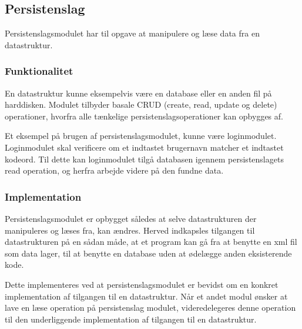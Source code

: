 \subsection{Persistenslag}
\label{sub:persistenslag}

Persistenslagsmodulet har til opgave at manipulere og læse data fra en datastruktur. 

\subsubsection{Funktionalitet}
\label{ssub:persistenslag_funktionalitet}

En datastruktur kunne eksempelvis være en database eller en anden fil på harddisken. Modulet tilbyder basale CRUD (create, read, update og delete) operationer, hvorfra alle tænkelige persistenslagsoperationer kan opbygges af.

Et eksempel på brugen af persistenslagsmodulet, kunne være loginmodulet. Loginmodulet skal verificere om et indtastet brugernavn matcher et indtastet kodeord. Til dette kan loginmodulet tilgå databasen igennem persistenslagets read operation, og herfra arbejde videre på den fundne data.


\subsubsection{Implementation}
\label{ssub:persistenslag_implementation}


Persistenslagsmodulet er opbygget således at selve datastrukturen der manipuleres og læses fra, kan ændres. Herved indkapsles tilgangen til datastrukturen på en sådan måde, at et program kan gå fra at benytte en xml fil som data lager, til at benytte en database uden at ødelægge anden eksisterende kode.

Dette implementeres ved at persistenslagsmodulet er bevidst om en konkret implementation af tilgangen til en datastruktur. Når et andet modul ønsker at lave en læse operation på persistenslag modulet, videredelegeres denne operation til den underliggende implementation af tilgangen til en datastruktur.
